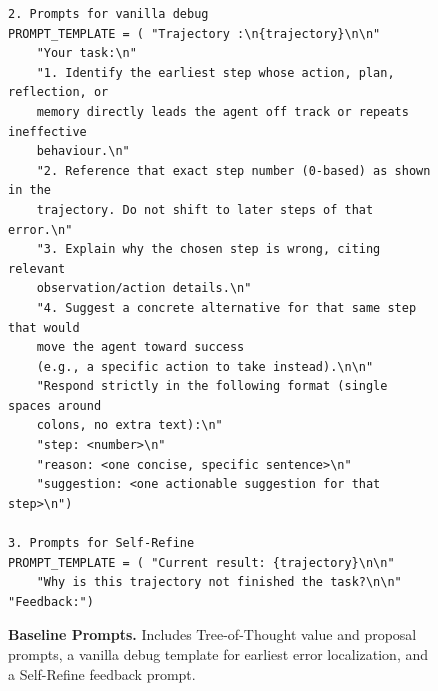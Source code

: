 \begin{figure}[htbp]
\begin{tcolorbox}[
    title=\textbf{Baseline Prompts},
    colback=yellow!1!white,
    colframe=yellow!50!black,
    fonttitle=\bfseries
]
\begin{verbatim}
2. Prompts for vanilla debug
PROMPT_TEMPLATE = ( "Trajectory :\n{trajectory}\n\n"
    "Your task:\n"
    "1. Identify the earliest step whose action, plan, reflection, or 
    memory directly leads the agent off track or repeats ineffective 
    behaviour.\n"
    "2. Reference that exact step number (0-based) as shown in the 
    trajectory. Do not shift to later steps of that error.\n"
    "3. Explain why the chosen step is wrong, citing relevant 
    observation/action details.\n"
    "4. Suggest a concrete alternative for that same step that would 
    move the agent toward success 
    (e.g., a specific action to take instead).\n\n"
    "Respond strictly in the following format (single spaces around 
    colons, no extra text):\n"
    "step: <number>\n"
    "reason: <one concise, specific sentence>\n"
    "suggestion: <one actionable suggestion for that step>\n")

3. Prompts for Self-Refine
PROMPT_TEMPLATE = ( "Current result: {trajectory}\n\n"
    "Why is this trajectory not finished the task?\n\n" "Feedback:")
\end{verbatim}
\end{tcolorbox}
\caption{\textbf{Baseline Prompts.} Includes Tree-of-Thought value and proposal prompts, a vanilla debug template for earliest error localization, and a Self-Refine feedback prompt.}
\label{fig:baseline_prompts}
\end{figure}




